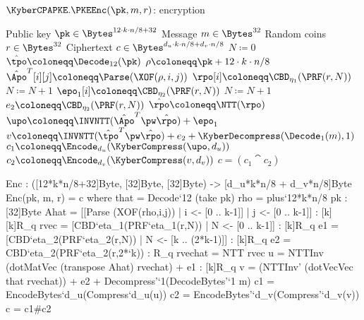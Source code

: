 \begin{algorithm}
  \caption{$\KyberCPAPKE.\PKEEnc(\pk, m, r)$: encryption
  \label{kybercpa-enc}}
  \begin{algorithmic}[1]
    \Require Public key $\pk \in \Bytes^{12\cdot k\cdot n/8 + 32}$
    \Require Message $m \in \Bytes^{32}$
    \Require Random coins $r \in \Bytes^{32}$
    \Ensure Ciphertext $c \in \Bytes^{d_u\cdot k\cdot n/8 + d_v\cdot n/8}$
    \State $N \coloneqq 0$
    \State $\hat{\tpo} \coloneqq \Decode_{12}(\pk)$
    \State $\rho \coloneqq \pk+12\cdot k\cdot n/8$
               
      \State $\hat{\Apo}^T[i][j] \coloneqq \Parse(\XOF(\rho, i, j))$     
    \EndFor
    \EndFor
    \label{line:kybercpa-enc:rpo}       
      \State $\rpo[i] \coloneqq \CBD_{\eta_1}(\PRF(r, N))$
      \State $N \coloneqq N+1$
    \EndFor
    \label{line:kybercpa-enc:epo}       
      \State $\epo_1[i] \coloneqq \CBD_{\eta_2}(\PRF(r, N))$
      \State $N \coloneqq N+1$
    \EndFor
    \State $e_2 \coloneqq \CBD_{\eta_2}(\PRF(r, N))$                 
    \State $\hat{\rpo} \coloneqq \NTT(\rpo)$\label{line:kybercpa-enc:nttr}
    \State $\upo \coloneqq \INVNTT(\hat{\Apo}^T \pw \hat{\rpo}) + \epo_1$\label{line:kybercpa-enc:invnttar} 
    \State $v \coloneqq \INVNTT(\hat{\tpo}^T\pw\hat{\rpo}) + e_2 + \KyberDecompress(\Decode_1(m),1)$ \label{line:kybercpa-enc:v} 
    \State $c_1 \coloneqq \Encode_{d_u}(\KyberCompress(\upo, d_u))$
    \State $c_2 \coloneqq \Encode_{d_v}(\KyberCompress(v, d_v))$
    \State \Return $c = (c_1\cat c_2)$ 
  \end{algorithmic}
\end{algorithm}

\begin{code}
  Enc : ([12*k*n/8+32]Byte, [32]Byte, [32]Byte) -> [d_u*k*n/8 + d_v*n/8]Byte
  Enc(pk, m, r) = c where
    that = Decode`{12} (take pk)
    rho = plus`{12*k*n/8} pk : [32]Byte
    Ahat = [[Parse (XOF(rho,i,j)) | i <- [0 .. k-1]] | j <- [0 .. k-1]] : [k][k]R_q
    rvec = [CBD`{eta_1}(PRF`{eta_1}(r,N)) | N <- [0 .. k-1]] : [k]R_q
    e1 = [CBD`{eta_2}(PRF`{eta_2}(r,N)) | N <- [k .. (2*k-1)]] : [k]R_q
    e2 = CBD`{eta_2}(PRF`{eta_2}(r,2*`k)) : R_q
    rvechat = NTT rvec
    u = NTTInv (dotMatVec (transpose Ahat) rvechat) + e1 : [k]R_q
    v = (NTTInv' (dotVecVec that rvechat)) + e2 + Decompress'`{1}(DecodeBytes'`{1} m)
    c1 = EncodeBytes`{d_u}(Compress`{d_u}(u))
    c2 = EncodeBytes'`{d_v}(Compress'`{d_v}(v))
    c = c1#c2
\end{code}

